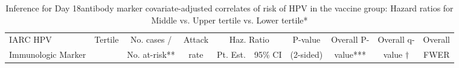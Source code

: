 \begin{longtable}{lccccccccc}
\caption{Inference for Day 18antibody marker covariate-adjusted correlates of risk of HPV in the vaccine group: Hazard ratios for Middle vs. Upper tertile vs. Lower tertile*} \\ 
   \hline
 
         \multicolumn{1}{l}{IARC HPV} & \multicolumn{1}{c}{Tertile}   & \multicolumn{1}{c}{No. cases /}   & \multicolumn{1}{c}{Attack}   & \multicolumn{2}{c}{Haz. Ratio}                     & \multicolumn{1}{c}{P-value}   & \multicolumn{1}{c}{Overall P-}      & \multicolumn{1}{c}{Overall q-}   & \multicolumn{1}{c}{Overall} \\ 
         \multicolumn{1}{l}{Immunologic Marker}            & \multicolumn{1}{c}{}          & \multicolumn{1}{c}{No. at-risk**} & \multicolumn{1}{c}{rate}   & \multicolumn{1}{c}{Pt. Est.} & \multicolumn{1}{c}{95\% CI} & \multicolumn{1}{c}{(2-sided)} & \multicolumn{1}{c}{value***} & \multicolumn{1}{c}{value $\dagger$} & \multicolumn{1}{c}{FWER} \\ 
         \hline
 

\end{longtable}
